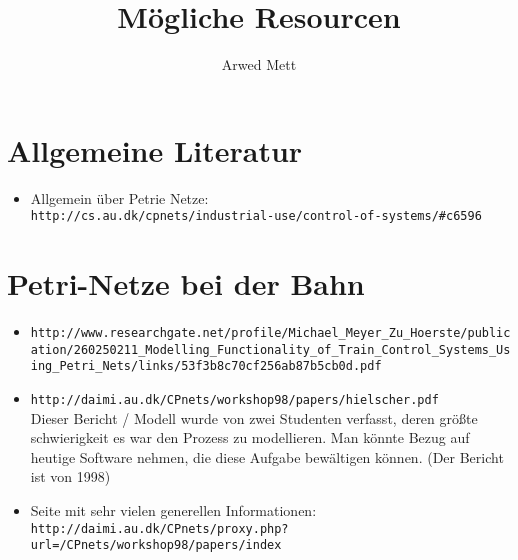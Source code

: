 \documentclass{article}
\author{Arwed Mett}
\title{Mögliche Resourcen}
\begin{document}
\maketitle

\section{Allgemeine Literatur}
\begin{itemize}
    \item Allgemein über Petrie Netze:\\
        \verb+http://cs.au.dk/cpnets/industrial-use/control-of-systems/#c6596+
\end{itemize}

\section{Petri-Netze bei der Bahn}
\begin{itemize}
    \item \verb+http://www.researchgate.net/profile/Michael_Meyer_Zu_Hoerste/publication/260250211_Modelling_Functionality_of_Train_Control_Systems_Using_Petri_Nets/links/53f3b8c70cf256ab87b5cb0d.pdf+
    \item \verb+http://daimi.au.dk/CPnets/workshop98/papers/hielscher.pdf+\\
        Dieser Bericht / Modell wurde von zwei Studenten verfasst, deren größte schwierigkeit es war den Prozess zu modellieren.
        Man könnte Bezug auf heutige Software nehmen, die diese Aufgabe bewältigen können. (Der Bericht ist von 1998)

    \item Seite mit sehr vielen generellen Informationen:\\
        \verb+http://daimi.au.dk/CPnets/proxy.php?url=/CPnets/workshop98/papers/index+
\end{itemize}
\end{document}
